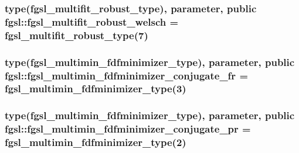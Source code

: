 \hypertarget{classfgsl_a5d48e88448a37e7bdc7af12abc799a83}{
\subsubsection[{fgsl\-\_\-multifit\-\_\-robust\-\_\-welsch}]{\setlength{\rightskip}{0pt plus 5cm}type({\bf fgsl\-\_\-multifit\-\_\-robust\-\_\-type}), parameter, public fgsl\-::fgsl\-\_\-multifit\-\_\-robust\-\_\-welsch = {\bf fgsl\-\_\-multifit\-\_\-robust\-\_\-type}(7)}}\label{classfgsl_a5d48e88448a37e7bdc7af12abc799a83}
\hypertarget{classfgsl_a94fc756d777c9358f808374b01e6a879}{
\subsubsection[{fgsl\-\_\-multimin\-\_\-fdfminimizer\-\_\-conjugate\-\_\-fr}]{\setlength{\rightskip}{0pt plus 5cm}type({\bf fgsl\-\_\-multimin\-\_\-fdfminimizer\-\_\-type}), parameter, public fgsl\-::fgsl\-\_\-multimin\-\_\-fdfminimizer\-\_\-conjugate\-\_\-fr = {\bf fgsl\-\_\-multimin\-\_\-fdfminimizer\-\_\-type}(3)}}\label{classfgsl_a94fc756d777c9358f808374b01e6a879}
\hypertarget{classfgsl_a8ac392b0c99b65482d4a3f6a8f719ed6}{
\subsubsection[{fgsl\-\_\-multimin\-\_\-fdfminimizer\-\_\-conjugate\-\_\-pr}]{\setlength{\rightskip}{0pt plus 5cm}type({\bf fgsl\-\_\-multimin\-\_\-fdfminimizer\-\_\-type}), parameter, public fgsl\-::fgsl\-\_\-multimin\-\_\-fdfminimizer\-\_\-conjugate\-\_\-pr = {\bf fgsl\-\_\-multimin\-\_\-fdfminimizer\-\_\-type}(2)}}\label{classfgsl_a8ac392b0c99b65482d4a3f6a8f719ed6}
